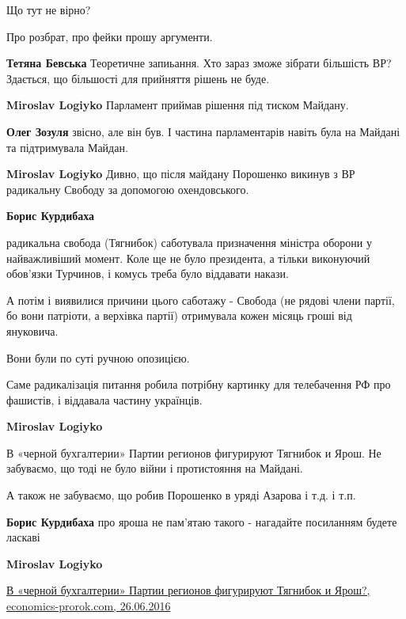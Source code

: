 \begin{itemize}
\begin{itemize}
\begin{itemize}
Що тут не вірно?

Про розбрат, про фейки прошу аргументи.

\textbf{Тетяна Бевська} Теоретичне запиьання. Хто зараз зможе зібрати більшість ВР? Здається, що більшості для прийняття рішень не буде.

\end{itemize} %

\textbf{Miroslav Logiyko} Парламент приймав рішення під тиском Майдану.

\textbf{Олег Зозуля} звісно, але він був. І частина парламентарів навіть була на Майдані та підтримувала Майдан.

\textbf{Miroslav Logiyko} Дивно, що після майдану Порошенко викинув з ВР радикальну Свободу за допомогою охендовського.

\begin{itemize} %
\textbf{Борис Курдибаха} 

радикальна свобода (Тягнибок) саботувала призначення міністра оборони у
найважливіший момент. Коле ще не було президента, а тільки виконуючий обов'язки
Турчинов, і комусь треба було віддавати накази.

А потім і виявилися причини цього саботажу - Свобода (не рядові члени партії,
бо вони патріоти, а верхівка партії) отримувала кожен місяць гроші від
януковича.

Вони були по суті ручною опозицією.

Саме радикалізація питання робила потрібну картинку для телебачення РФ про
фашистів, і віддавала частину українців.


\textbf{Miroslav Logiyko} 

В «черной бухгалтерии» Партии регионов фигурируют Тягнибок и Ярош. Не
забуваємо, що тоді не було війни і протистояння на Майдані.

А також не забуваємо, що робив Порошенко в уряді Азарова і т.д. і т.п.


\textbf{Борис Курдибаха} про яроша не пам'ятаю такого - нагадайте посиланням будете ласкаві

\textbf{Miroslav Logiyko} 

\href{https://www.economics-prorok.com/2016/06/blog-post_233-2.html}{%
В «черной бухгалтерии» Партии регионов фигурируют Тягнибок и Ярош?, economics-prorok.com, 26.06.2016%
}


\end{itemize}
\end{itemize}
\end{itemize}
